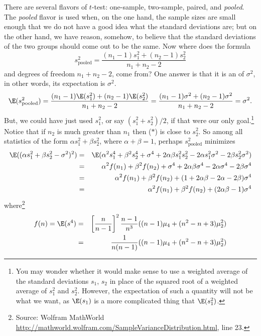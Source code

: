 There are several flavors of $t$-test: one-sample, two-sample, paired, and \emph{pooled}.
The \emph{pooled} flavor is used when, on the one hand, the sample sizes are small enough that we do not have a good idea what the standard deviations are; but on the other hand, we have reason, somehow, to believe that the standard deviations of the two groups should come out to be the same.
Now where does the formula
\[
	s^2_{\text{pooled}} = \frac{(n_1-1)s_1^2+(n_2-1)s_2^2}{n_1+n_2-2}\tag{*}
\]
and degrees of freedom $n_1+n_2-2$, come from?
One answer is that it is an  of $\sigma^2$, in other words, its expectation is $\sigma^2$.
\[
	\E(s^2_{\text{pooled}}) = \frac{(n_1-1)\E(s_1^2)+(n_2-1)\E(s_2^2)}{n_1+n_2-2} = \frac{(n_1-1)\sigma^2+(n_2-1)\sigma^2}{n_1+n_2-2} = \sigma^2.
\]
But, we could have just used $s_1^2$, or say $(s_1^2+s_2^2)/2$, if that were our only goal.\footnote{%
You may wonder whether it would make sense to use a weighted average of the standard deviations $s_1$, $s_2$ in place of the squared root of a weighted average of $s_1^2$ and $s_2^2$. However, the expectation of such a quantity will not be what we want, as $\E(s_1)$ is a more complicated thing that $\E(s_1^2)$.}
Notice that if $n_2$ is much greater than $n_1$ then ($*$) is close to $s_2^2$.
So among all statistics of the form $\alpha s_1^2+\beta s_2^2$, where $\alpha+\beta=1$, perhaps $s^2_{\text{pooled}}$ minimizes
\begin{eqnarray*}
	  \E((\alpha s_1^2+\beta s_2^2-\sigma^2)^2)&=& \E(\alpha^2s_1^4+\beta^2s_2^4+\sigma^4+2\alpha\beta s_1^2s_2^2 -2\alpha s_1^2\sigma^2-2\beta s_2^2\sigma^2)\\
	&=& \alpha^2 f(n_1) + \beta^2 f(n_2) + \sigma^4 + 2\alpha\beta\sigma^4 - 2\alpha\sigma^4-2\beta\sigma^4\\
	&=& \alpha^2 f(n_1) + \beta^2 f(n_2) + (1 + 2\alpha\beta - 2\alpha-2\beta)\sigma^4\\
	&=& \alpha^2 f(n_1) + \beta^2 f(n_2) + (2\alpha\beta - 1)\sigma^4
\end{eqnarray*}
where\footnote{Source: Wolfram MathWorld \url{http://mathworld.wolfram.com/SampleVarianceDistribution.html}, line 23.}
\begin{eqnarray*}
	f(n)=\E(s^4)&=&\left[\frac{n}{n-1}\right]^2\frac{n-1}{n^3}((n-1)\mu_4+(n^2-n+3)\mu_2^2)\\
	&=& \frac{1}{n(n-1)}((n-1)\mu_4+(n^2-n+3)\mu_2^2)
\end{eqnarray*}
